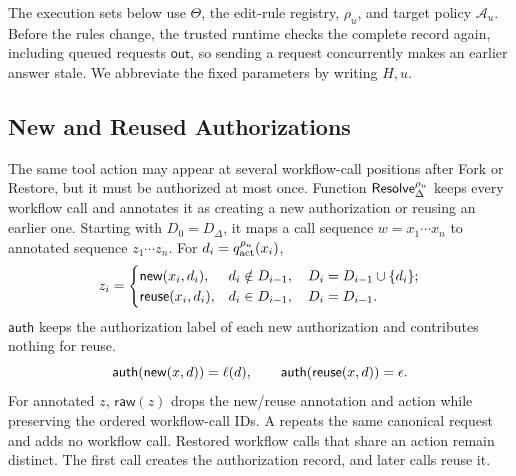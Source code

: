 The execution sets below use \(\Theta\), the edit-rule registry, \(\rho_u\), and target policy \(\mathcal A_u\).
Before the rules change, the trusted runtime checks the complete record again, including queued requests \(\mathsf{out}\), so sending a request concurrently makes an earlier answer stale.
We abbreviate the fixed parameters by writing \(H,u\).

\subsection{New and Reused Authorizations}
The same tool action may appear at several workflow-call positions after Fork or Restore, but it must be authorized at most once.
Function \(\mathsf{Resolve}^{\rho_u}_\Delta\) keeps every workflow call and annotates it as creating a new authorization or reusing an earlier one.
Starting with \(D_0=D_\Delta\), it maps a call sequence \(w=x_1\cdots x_n\) to annotated sequence \(z_1\cdots z_n\).
For \(d_i=q^{\rho_u}_{\rm act}(x_i)\),
\begin{equation}
\label{eq:resolve}
 z_i=
 \begin{cases}
  \mathsf{new}(x_i,d_i), & d_i\notin D_{i-1},
       \quad D_i=D_{i-1}\cup\{d_i\};\\
  \mathsf{reuse}(x_i,d_i), & d_i\in D_{i-1},
       \quad D_i=D_{i-1}.
 \end{cases}
\end{equation}
\(\mathsf{auth}\) keeps the authorization label of each new authorization and contributes nothing for reuse.
\[
 \mathsf{auth}(\mathsf{new}(x,d))=\ell(d),\qquad
 \mathsf{auth}(\mathsf{reuse}(x,d))=\epsilon .
\]
For annotated \(z\), \(\mathsf{raw}(z)\) drops the new/reuse annotation and action while preserving the ordered workflow-call IDs.
A \Retry repeats the same canonical request and adds no workflow call.
Restored workflow calls that share an action remain distinct.
The first call creates the authorization record, and later calls reuse it.

